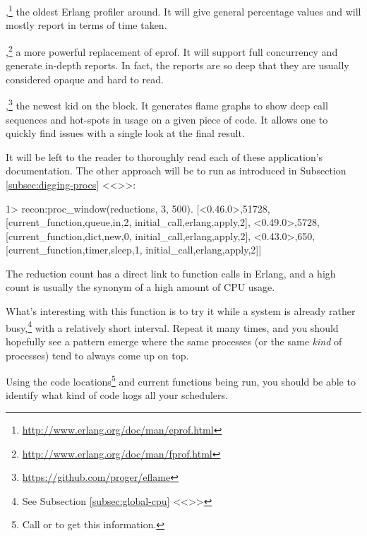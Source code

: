 \documentclass[11pt, oneside]{book}   	%
\newcommand\NamedRef[1]{\ref{#1} <<\nameref{#1}>>}
\begin{document}
\begin{itemize*}
	\item {},\footnote{\href{http://www.erlang.org/doc/man/eprof.html}{http://www.erlang.org/doc/man/eprof.html}} the oldest Erlang profiler around. It will give general percentage values and will mostly report in terms of time taken.
	\item {},\footnote{\href{http://www.erlang.org/doc/man/fprof.html}{http://www.erlang.org/doc/man/fprof.html}} a more powerful replacement of eprof. It will support full concurrency and generate in-depth reports. In fact, the reports are so deep that they are usually considered opaque and hard to read. 
	\item {},\footnote{\href{https://github.com/proger/eflame}{https://github.com/proger/eflame}} the newest kid on the block. It generates flame graphs to show deep call sequences and hot-spots in usage on a given piece of code. It allows one to quickly find issues with a single look at the final result.
\end{itemize*}

It will be left to the reader to thoroughly read each of these application's documentation. The other approach will be to run  as introduced in Subsection \NamedRef{subsec:digging-procs}:

\begin{VerbatimEshell}
1> recon:proc_window(reductions, 3, 500).
[{<0.46.0>,51728,
  [{current_function,{queue,in,2}},
   {initial_call,{erlang,apply,2}}]},
 {<0.49.0>,5728,
  [{current_function,{dict,new,0}},
   {initial_call,{erlang,apply,2}}]},
 {<0.43.0>,650,
  [{current_function,{timer,sleep,1}},
   {initial_call,{erlang,apply,2}}]}]
\end{VerbatimEshell}

The reduction count has a direct link to function calls in Erlang, and a high count is usually the synonym of a high amount of CPU usage. 

What's interesting with this function is to try it while a system is already rather busy,\footnote{See Subsection \NamedRef{subsec:global-cpu}} with a relatively short interval. Repeat it many times, and you should hopefully see a pattern emerge where the same processes (or the same \emph{kind} of processes) tend to always come up on top.

Using the code locations\footnote{Call  or  to get this information.} and current functions being run, you should be able to identify what kind of code hogs all your schedulers.
\end{document}
